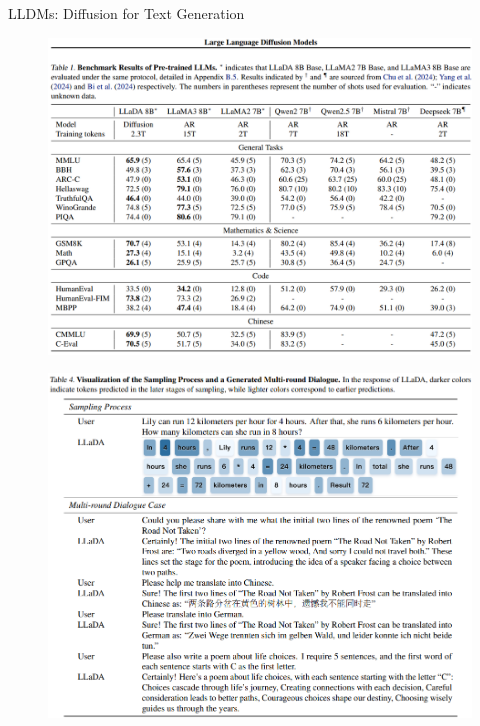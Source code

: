 \begin{frame}[allowframebreaks]{LLDMs: Diffusion for Text Generation}
\framebreak
    \begin{figure}
        \centering
        \includegraphics[height=0.9\textheight,width=1.05\textwidth,keepaspectratio]{images/recent-advance/lldm-benchmark-result.png}
    \end{figure}

\framebreak
    \begin{figure}
        \centering
        \includegraphics[height=0.9\textheight,width=1.05\textwidth,keepaspectratio]{images/recent-advance/lldm-sampling.png}
    \end{figure}
\end{frame}

